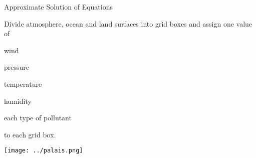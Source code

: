 \begin{slide}{Approximate Solution of Equations}

\begin{minipage}{0.49\linewidth}
\begin{list0}
\item Divide atmosphere, ocean and land surfaces into grid boxes and assign one value of
    \begin{list1}
    \item wind
    \item pressure
    \item temperature
    \item humidity
    \item each type of pollutant
    \end{list1}
to each grid box. 
\end{list0}
\end{minipage}
\begin{minipage}{0.49\linewidth}
\texttt{[image: ../palais.png]}
\end{minipage}

\end{slide}




